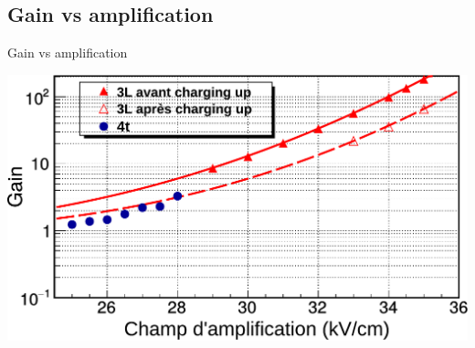   \subsection{Gain vs amplification}

    \begin{frame}{Gain vs amplification}
        \begin{scriptsize}
            \centering \includegraphics[width=\textwidth]{./pictures/gain_vs_ampli.pdf} \\
        \end{scriptsize}
    \end{frame}
    
